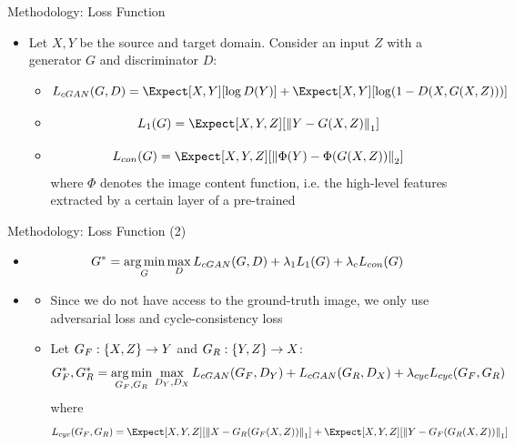 \documentclass{cubeamer}
\begin{document}
\begin{frame}{Methodology: Loss Function}
    \begin{itemize}
        \item {}
        
        Let $X, Y$ be the source and target domain. Consider an input $Z$ with a generator $G$ and discriminator $D$:
        \begin{itemize}
            \item {}
            $$
            L_{cGAN}(G,D) = \Expect[X,Y]\bracket*{\log D(Y)} + \Expect[X,Y]\bracket*{\log \parens*{1 - D(X, G(X,Z))}}
            $$
            \item {}
            $$
            L_{1}(G) = \Expect[X,Y,Z]\bracket*{\norm{Y - G(X,Z)}_1}
            $$
            \item {}
            $$
            L_{con}(G) = \Expect[X,Y,Z]\bracket*{\norm{\Phi(Y) - \Phi(G(X,Z))}_2}
            $$
            where $\Phi$ denotes the image content function, i.e. the high-level features extracted by a certain layer of a pre-trained 
        \end{itemize}
    \end{itemize}
\end{frame}

\begin{frame}{Methodology: Loss Function (2)}
    \begin{itemize}
        \item {}
        $$
        G^* = \operatorname*{arg\,min}_{G} \max_{D} L_{cGAN}(G,D) + \lambda_1 L_{1}(G) + \lambda_c L_{con}(G)
        $$
        \item {}
        \begin{itemize}
            \item Since we do not have access to the ground-truth image, we only use adversarial loss and cycle-consistency loss
            \item Let $G_F: \{X,Z\} \rightarrow Y$ and $G_R: \{Y,Z\} \rightarrow X$:
            $$
            G_F^*, G_R^* = \operatorname*{arg\,min}_{G_F, G_R} \max_{D_Y, D_X} L_{cGAN}(G_F,D_Y) + L_{cGAN}(G_R,D_X) + \lambda_{cyc} L_{cyc} (G_F, G_R)
            $$
            where
            $$
            L_{cyc} (G_F, G_R) = \Expect[X,Y,Z]\bracket*{\norm{X - G_R(G_F(X,Z))}_1} + \Expect[X,Y,Z]\bracket*{\norm{Y - G_F(G_R(X,Z))}_1}
            $$
        \end{itemize}
    \end{itemize}
\end{frame}
\end{document}
